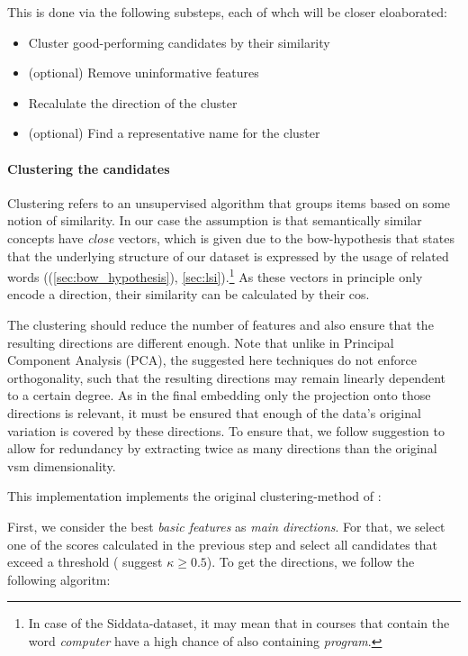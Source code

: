This is done via the following substeps, each of whch will be closer eloaborated:

\begin{itemize}
	\item Cluster good-performing candidates by their similarity
	\item (optional) Remove uninformative features
	\item Recalulate the direction of the cluster
	\item (optional) Find a representative name for the cluster
\end{itemize}

\paragraph{Clustering the candidates}

Clustering refers to an unsupervised algorithm that groups items based on some notion of similarity. In our case the assumption is that semantically similar concepts have \textit{close} vectors, which is given due to the \gls{bow}-hypothesis that states that the underlying structure of our dataset is expressed by the usage of related words ((\autoref{sec:bow_hypothesis}), \ref{sec:lsi}).\footnote{In case of the Siddata-dataset, it may mean that in courses that contain the word \textit{computer} have a high chance of also containing \textit{program}.} As these vectors in principle only encode a direction, their similarity can be calculated by their \gls{cos}.

The clustering should reduce the number of features and also ensure that the resulting directions are different enough. Note that unlike \eg in Principal Component Analysis (PCA), the suggested here techniques do not enforce orthogonality, such that the resulting directions may remain linearly dependent to a certain degree. As in the final embedding only the projection onto those directions is relevant, it must be ensured that enough of the data's original variation is covered by these directions. To ensure that, we follow  suggestion to allow for redundancy by extracting twice as many directions than the original \gls{vsm} dimensionality. 

This implementation implements the original clustering-method of \cite{Derrac2015}:

First, we consider the best \textit{basic features} as \textit{main directions}. For that, we select one of the scores calculated in the previous step and select all candidates that exceed a threshold (\cite{Derrac2015} suggest $\kappa \geq 0.5$).
To get the directions, we follow the following algoritm:

